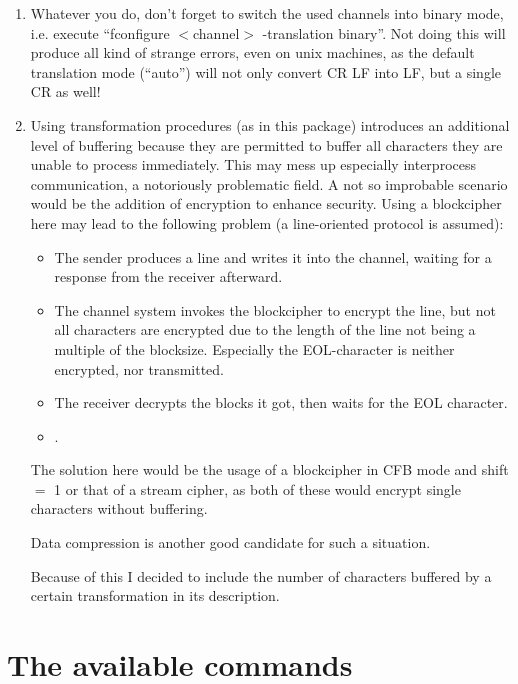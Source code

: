 \documentclass {report}
\begin{document}
\begin {enumerate}
\item	Whatever you do, don't forget to switch the used channels into
	binary mode, i.e. execute ``fconfigure $<$channel$>$ -translation
	binary''. Not doing this will produce all kind of strange
	errors, even on unix machines, as the default translation mode
	(``auto'') will not only convert CR LF into LF, but a single
	CR as well!

\item	Using transformation procedures (as in this package)
	introduces an additional level of buffering because they are
	permitted to buffer all characters they are unable to process
	immediately. This may mess up especially
	interprocess communication, a notoriously problematic field. A
	not so improbable scenario would be the addition of encryption
	to enhance security. Using a blockcipher here may lead to the
	following problem (a line-oriented protocol is assumed):

	\begin {itemize}
	\item	The sender produces a line and writes it into the channel,
		waiting for a response from the receiver afterward.
	\item	The channel system invokes the blockcipher to encrypt
		the line, but not all characters are encrypted due to
		the length of the line not being a multiple of the
		blocksize. Especially the EOL-character is neither
		encrypted, nor transmitted.
	\item	The receiver decrypts the blocks it got, then waits
		for the EOL character.
	\item	{}.
	\end   {itemize}

	The solution here would be the usage of a blockcipher in CFB
	mode and shift $=$ 1 or that of a stream cipher, as both of these
	would encrypt single characters without buffering.

	Data compression is another good candidate for such a situation.

	Because of this I decided to include the number of characters
	buffered by a certain transformation in its description.

\end   {enumerate}


\chapter {The available commands}
\end{document}
